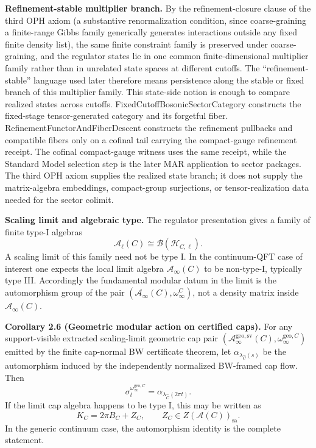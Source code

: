 \textbf{Refinement-stable multiplier branch.} By the refinement-closure clause of the third OPH axiom (a substantive renormalization condition, since coarse-graining a finite-range Gibbs family generically generates interactions outside any fixed finite density list), the same finite constraint family is preserved under coarse-graining, and the regulator states lie in one common finite-dimensional multiplier family rather than in unrelated state spaces at different cutoffs. The ``refinement-stable'' language used later therefore means persistence along the stable or fixed branch of this multiplier family. This state-side notion is enough to compare realized states across cutoffs. FixedCutoffBosonicSectorCategory constructs the fixed-stage tensor-generated category and its forgetful fiber. RefinementFunctorAndFiberDescent constructs the refinement pullbacks and compatible fibers only on a cofinal tail carrying the compact-gauge refinement receipt. The cofinal compact-gauge witness uses the same receipt, while the Standard Model selection step is the later MAR application to sector packages. The third OPH axiom supplies the realized state branch; it does not supply the matrix-algebra embeddings, compact-group surjections, or tensor-realization data needed for the sector colimit.

\textbf{Scaling limit and algebraic type.} The regulator presentation gives a family of finite type-I algebras
\[
\mathcal A_{\ell}(C)\cong \mathcal B(\mathcal H_{C,\ell}).
\]
A scaling limit of this family need not be type I. In the continuum-QFT case of interest one expects the local limit algebra \(\mathcal A_\infty(C)\) to be non-type-I, typically type III. Accordingly the fundamental modular datum in the limit is the automorphism group of the pair \((\mathcal A_\infty(C),\omega_\infty^C)\), not a density matrix inside \(\mathcal A_\infty(C)\).

\textbf{Corollary 2.6 (Geometric modular action on certified caps).} For any support-visible
extracted scaling-limit geometric cap pair
\((\mathcal A_\infty^{\mathrm{geo,sv}}(C),\omega_\infty^{\mathrm{geo},C})\) emitted by the finite
cap-normal BW certificate theorem, let \(\alpha_{\lambda_{\widehat C}(s)}\) be the automorphism
induced by the independently normalized BW-framed cap flow. Then
\[
\sigma_t^{\omega_\infty^{\mathrm{geo},C}}
=
\alpha_{\lambda_{\widehat C}(2\pi t)}.
\]
If the limit cap algebra happens to be type I, this may be written as
\[
K_C=2\pi B_C+Z_C,\qquad Z_C\in Z(\mathcal A(C))_{\mathrm{sa}}.
\]
In the generic continuum case, the automorphism identity is the complete statement.

